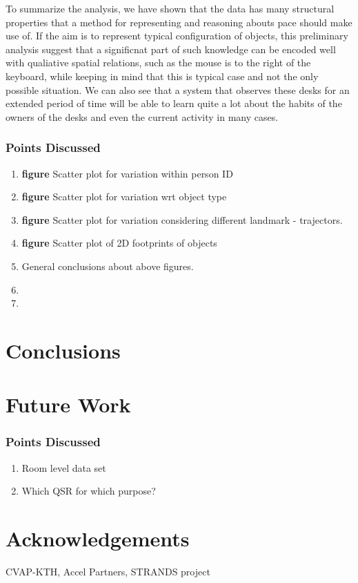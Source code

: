 \documentclass[letterpaper, 10 pt, conference]{ieeeconf}  %
\begin{document}
To summarize the analysis, we have shown that the data has many structural properties that a method for representing and reasoning abouts 
pace should make use of. If the aim is to represent typical configuration of objects, this preliminary analysis suggest that a significnat 
part of such knowledge can be encoded well with qualiative spatial relations, such as the mouse is to the right of the keyboard, while 
keeping in mind that this is typical case and not the only possible situation. We can also see that a system that observes these desks for 
an extended period of time will be able to learn quite a lot about the habits of the owners of the desks and even the current activity in 
many cases. 

\subsubsection*{Points Discussed}
\begin{enumerate}
	\item \textbf{figure} Scatter plot for variation within person ID
	\item \textbf{figure} Scatter plot for variation wrt object type
	\item \textbf{figure} Scatter plot for variation considering different landmark - trajectors.
	\item \textbf{figure} Scatter plot of 2D footprints of objects
	\item General conclusions about above figures.
	\item 
	\item 
\end{enumerate}

\section{Conclusions}
\label{sec:Conclusions}

\section{Future Work}
\label{sec:Future Work}

\subsubsection*{Points Discussed}
\begin{enumerate}
	\item Room level data set
	\item Which QSR for which purpose?
\end{enumerate}

\section{Acknowledgements}
\label{sec:Acknowledgements}
CVAP-KTH, Accel Partners, STRANDS project



\end{document}

